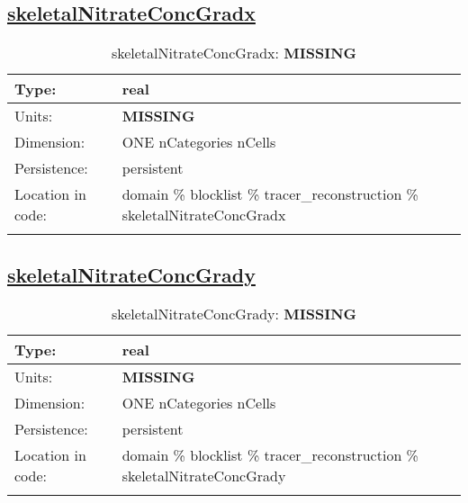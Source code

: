 \subsection[skeletalNitrateConcGradx]{\hyperref[sec:var_tab_tracer_reconstruction]{skeletalNitrateConcGradx}}
\label{subsec:var_sec_tracer_reconstruction_skeletalNitrateConcGradx}
\begin{center}
\begin{longtable}{| p{2.0in} | p{4.0in} |}
        \hline 
        Type: & real \\
        \hline 
        Units: & {\bf \color{red} MISSING} \\
        \hline 
        Dimension: & ONE nCategories nCells \\
        \hline 
        Persistence: & persistent \\
        \hline 
         Location in code: & domain \% blocklist \% tracer\_reconstruction \% skeletalNitrateConcGradx \\
         \hline 
    \caption{skeletalNitrateConcGradx: {\bf \color{red} MISSING}}
\end{longtable}
\end{center}
\subsection[skeletalNitrateConcGrady]{\hyperref[sec:var_tab_tracer_reconstruction]{skeletalNitrateConcGrady}}
\label{subsec:var_sec_tracer_reconstruction_skeletalNitrateConcGrady}
\begin{center}
\begin{longtable}{| p{2.0in} | p{4.0in} |}
        \hline 
        Type: & real \\
        \hline 
        Units: & {\bf \color{red} MISSING} \\
        \hline 
        Dimension: & ONE nCategories nCells \\
        \hline 
        Persistence: & persistent \\
        \hline 
         Location in code: & domain \% blocklist \% tracer\_reconstruction \% skeletalNitrateConcGrady \\
         \hline 
    \caption{skeletalNitrateConcGrady: {\bf \color{red} MISSING}}
\end{longtable}
\end{center}
